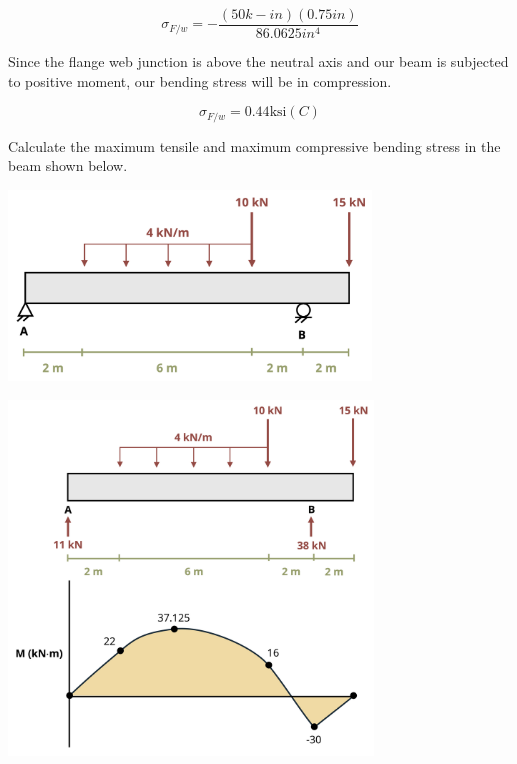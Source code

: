 \documentclass[
  letterpaper,
  DIV=11,
  numbers=noendperiod]{scrreprt}
\begin{document}
\begin{tcolorbox}
\[
\sigma_{F / w}=-\frac{(50 k-i n)(0.75 i n)}{86.0625 i n^4}
\]

Since the flange web junction is above the neutral axis and our beam is
subjected to positive moment, our bending stress will be in compression.

\[
\sigma_{F / w}=0.44 \mathrm{ksi}(C)
\]

\end{tcolorbox}

\begin{tcolorbox}[enhanced jigsaw, colback=white, colframe=quarto-callout-note-color-frame, leftrule=.75mm, opacitybacktitle=0.6, colbacktitle=quarto-callout-note-color!10!white, arc=.35mm, bottomrule=.15mm, breakable, title={Example 9.2: Bending stress problem\,}, left=2mm, titlerule=0mm, toptitle=1mm, toprule=.15mm, opacityback=0, rightrule=.15mm, coltitle=black, bottomtitle=1mm]

Calculate the maximum tensile and maximum compressive bending stress in
the beam shown below.

\begin{center}
\includegraphics[width=3.79167in,height=\textheight]{images/CH9 PNGs/Example 9.2 part 1.png}
\end{center}

\begin{center}
\includegraphics[width=3.8125in,height=\textheight]{images/CH9 PNGs/Example 9.2 part 2.png}
\end{center}


\end{tcolorbox}
\end{document}
